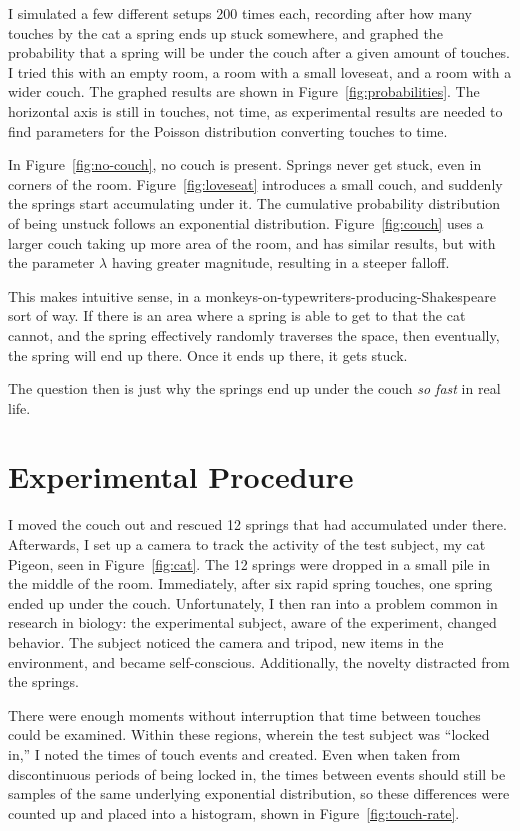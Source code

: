 \documentclass[twocolumn]{article}
\begin{document}
I simulated a few different setups 200 times each, recording after how many touches by the cat a spring ends up stuck somewhere, and graphed the probability that a spring will be under the couch after a given amount of touches. I tried this with an empty room, a room with a small loveseat, and a room with a wider couch. The graphed results are shown in Figure~\ref{fig:probabilities}. The horizontal axis is still in touches, not time, as experimental results are needed to find parameters for the Poisson distribution converting touches to time.

In Figure~\ref{fig:no-couch}, no couch is present. Springs never get stuck, even in corners of the room. Figure~\ref{fig:loveseat} introduces a small couch, and suddenly the springs start accumulating under it. The cumulative probability distribution of being unstuck follows an exponential distribution. Figure~\ref{fig:couch} uses a larger couch taking up more area of the room, and has similar results, but with the parameter $\lambda$ having greater magnitude, resulting in a steeper falloff.

This makes intuitive sense, in a monkeys-on-typewriters-producing-Shakespeare sort of way. If there is an area where a spring is able to get to that the cat cannot, and the spring effectively randomly traverses the space, then eventually, the spring will end up there. Once it ends up there, it gets stuck.

The question then is just why the springs end up under the couch \emph{so fast} in real life.

\section{Experimental Procedure}

I moved the couch out and rescued 12 springs that had accumulated under there. Afterwards, I set up a camera to track the activity of the test subject, my cat Pigeon, seen in Figure~\ref{fig:cat}. The 12 springs were dropped in a small pile in the middle of the room. Immediately, after six rapid spring touches, one spring ended up under the couch. Unfortunately, I then ran into a problem common in research in biology: the experimental subject, aware of the experiment, changed behavior. The subject noticed the camera and tripod, new items in the environment, and became self-conscious. Additionally, the novelty distracted from the springs.

There were enough moments without interruption that time between touches could be examined. Within these regions, wherein the test subject was ``locked in,'' I noted the times of touch events and created. Even when taken from discontinuous periods of being locked in, the times between events should still be samples of the same underlying exponential distribution, so these differences were counted up and placed into a histogram, shown in Figure~\ref{fig:touch-rate}.
\end{document}
